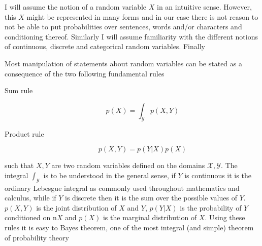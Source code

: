 I will assume the notion of a random variable $X$ in an intuitive sense.
However, this $X$ might be represented in many forms and in our case there is
not reason to not be able to put probabilities over sentences, words and/or
characters and conditioning thereof. Similarly I will assume familiarity with
the different notions of continuous, discrete and categorical random variables.
Finally 

Most manipulation of statements about random variables can be stated as a consequence
of the two following fundamental rules
\begin{description}
\item[Sum rule]
  \begin{equation}
    \label{eq:sum_rule}
    p(X) = \int_{\mathcal{Y}}p(X, Y)
  \end{equation}
\item[Product rule]
  \begin{equation}
    \label{eq:product_rule}
    p(X, Y) = p(Y | X)p(X)
  \end{equation}
\end{description}
such that $X, Y$ are two random variables defined on the domains $\mathcal{X},
\mathcal{Y}$. The integral $\int_{\mathcal{Y}}$ is to be understood in the
general sense, if $Y$ is continuous it is the ordinary Lebesgue integral as
commonly used throughout mathematics and calculus, while if $Y$ is discrete then
it is the sum over the possible values of $Y$. $p(X, Y)$ is the joint
distribution of $X$ and $Y$, $p(Y | X)$ is the probability of $Y$ conditioned on
n$X$ and $p(X)$ is the marginal distribution of $X$. Using these rules it is easy
to Bayes theorem, one of the most integral (and simple) theorem of probability
theory


